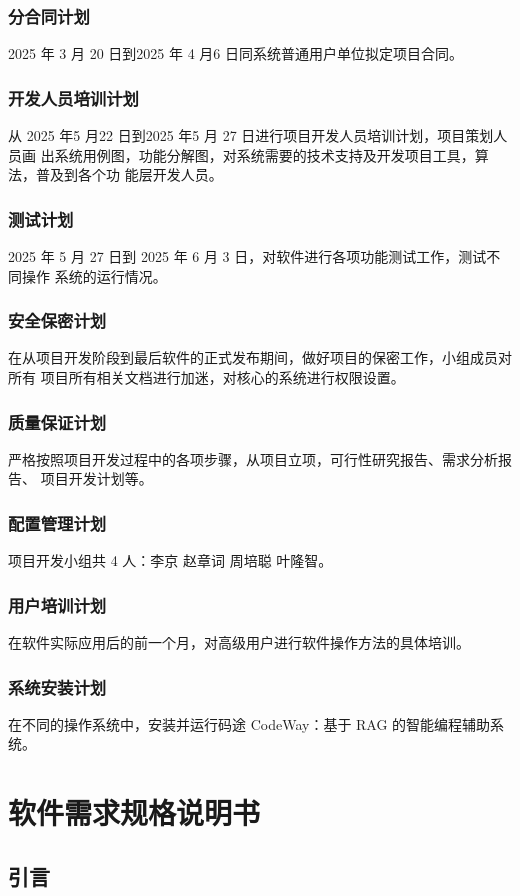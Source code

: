 \documentclass[
    report,     %
    oneside,    %
    UTF8,       %
    zihao=-4    %
]{config} %
\begin{document}
\subsection{分合同计划}
2025 年 3 月 20 日到2025 年 4 月6 日同系统普通用户单位拟定项目合同。
\subsection{开发人员培训计划}
从 2025 年5 月22 日到2025 年5 月 27 日进行项目开发人员培训计划，项目策划人员画
出系统用例图，功能分解图，对系统需要的技术支持及开发项目工具，算法，普及到各个功
能层开发人员。
\subsection{测试计划}
2025 年 5 月 27 日到 2025 年 6 月 3 日，对软件进行各项功能测试工作，测试不同操作
系统的运行情况。
\subsection{安全保密计划}
在从项目开发阶段到最后软件的正式发布期间，做好项目的保密工作，小组成员对所有
项目所有相关文档进行加迷，对核心的系统进行权限设置。
\subsection{质量保证计划}
严格按照项目开发过程中的各项步骤，从项目立项，可行性研究报告、需求分析报告、
项目开发计划等。
\subsection{配置管理计划}
项目开发小组共 4 人：李京 赵章词 周培聪 叶隆智。
\subsection{用户培训计划}
在软件实际应用后的前一个月，对高级用户进行软件操作方法的具体培训。
\subsection{系统安装计划}
在不同的操作系统中，安装并运行码途 CodeWay：基于 RAG 的智能编程辅助系统。


\chapter{软件需求规格说明书}
\section{引言}
\end{document}

